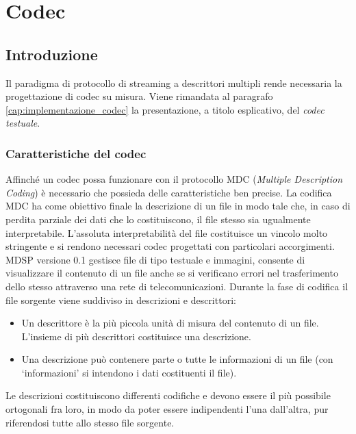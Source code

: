 \chapter{Codec}
\label{cap:codec}
\section{Introduzione}
Il paradigma di protocollo di streaming a descrittori multipli rende
necessaria la progettazione di codec su misura. Viene rimandata al paragrafo
\ref{cap:implementazione_codec} la presentazione, a titolo esplicativo, del
\emph{codec testuale}.

\subsection{Caratteristiche del codec}
Affinché un codec possa funzionare con il protocollo MDC (\emph{Multiple
Description Coding}) è necessario che possieda delle caratteristiche ben precise.
La codifica MDC ha come obiettivo finale la descrizione di un file in modo tale
che, in caso di perdita parziale dei dati che lo costituiscono, il file stesso
sia ugualmente interpretabile. L'assoluta interpretabilità del file costituisce
un vincolo molto stringente e si rendono necessari codec progettati con
particolari accorgimenti. MDSP versione 0.1 gestisce file di tipo testuale e
immagini, consente di visualizzare il contenuto di un file anche se si verificano
errori nel trasferimento dello stesso attraverso una rete di telecomunicazioni.
Durante la fase di codifica il file sorgente viene suddiviso in descrizioni e
descrittori:
\begin{itemize}
 \item Un descrittore è la più piccola unità di misura del contenuto di un
 file. L'insieme di più descrittori costituisce una descrizione.
 \item Una descrizione può contenere parte o tutte le informazioni di un file
 (con `informazioni' si intendono i dati costituenti il file).
\end{itemize}
Le descrizioni costituiscono differenti codifiche e devono essere il più possibile ortogonali fra loro, in modo da poter essere indipendenti l'una dall'altra, pur riferendosi tutte allo stesso file sorgente.

